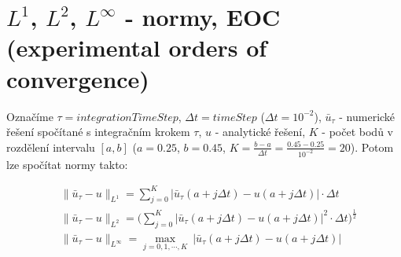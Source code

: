 \documentclass[11pt,american,czech]{article}
\begin{document}
\newpage

\section{$L^{1}$, $L^{2}$, $L^{\infty}$ - normy, EOC (experimental orders of convergence)}

Označíme $\tau = integrationTimeStep$, $\Delta t = timeStep$ ($\Delta t=10^{-2}$), $\bar{u}_{\tau}$ - numerické řešení spočítané s integračním krokem $\tau$, $u$ - analytické řešení, $K$ - počet bodů v rozdělení intervalu $[a, b]$ ($a=0.25$, $b=0.45$, $K = \tfrac{b-a}{\Delta t} = \tfrac{0.45-0.25}{10^{-2}}=20$). Potom lze spočítat normy takto:

\begin{equation*}
	\begin{split}
		&\rVert\bar{u}_{\tau}-u\lVert_{L^{1}} = \sum_{j=0}^{K}\lvert\bar{u}_{\tau}(a+j\Delta t)-u(a+j\Delta t)\rvert\cdot\Delta t \\
		&\rVert\bar{u}_{\tau}-u\lVert_{L^{2}} = \Big(\sum_{j=0}^{K}\lvert\bar{u}_{\tau}(a+j\Delta t)-u(a+j\Delta t)\rvert^{2}\cdot\Delta t\Big)^{\frac{1}{2}} \\
		&\rVert\bar{u}_{\tau}-u\lVert_{L^{\infty}} = \max_{j=0,1,\cdots,K}\  \lvert\bar{u}_{\tau}(a+j\Delta t)-u(a+j\Delta t)\rvert 
	\end{split}
\end{equation*}
\end{document}

